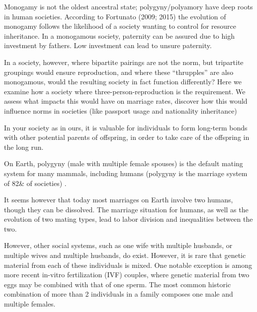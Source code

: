 
Monogamy is not the oldest ancestral state; polygyny/polyamory have deep roots in human societies. According to Fortunato (2009; 2015) the evolution of monogamy follows the likelihood of a society wanting to control for resource inheritance. In a monogamous society, paternity can be assured due to high investment by fathers. Low investment can lead to unsure paternity.

In a society, however, where bipartite pairings are not the norm, but tripartite groupings would ensure reproduction, and where these “thrupples” are also monogamous, would the resulting society in fact function differently? Here we examine how a society where three-person-reproduction is the requirement. We assess what impacts this would have on marriage rates, discover how this would influence norms in societies (like passport usage and nationality inheritance) 


In your society as in ours, it is valuable for individuals to form long-term bonds with other potential parents of offspring, in order to take care of the offspring in the long run. 

On Earth, polygyny (male with multiple female spouses) is the default mating system for many mammals, including humans (polygyny is the marriage system of 82\& of societies) \cite{Fortunato2015}.

It seems however that today most marriages on Earth involve two humans, though they can be dissolved. The marriage situation for humans, as well as the evolution of two mating types, lead to labor division and inequalities between the two. 

However, other social systems, such as one wife with multiple husbands, or multiple wives and multiple husbands, do exist. However, it is rare that genetic material from each of these individuals is mixed. One notable exception is among more recent in-vitro fertilization (IVF) couples, where genetic material from two eggs may be combined with that of one sperm. The most common historic combination of more than 2 individuals in a family composes one male and multiple females.

